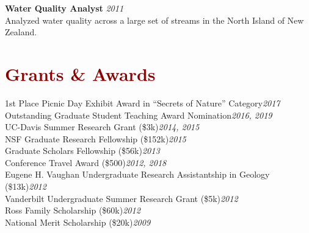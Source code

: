 \documentclass[11pt,margin,line]{resume}
\begin{document}
\begin{resume}
\textbf{Water Quality Analyst} \hfill \emph{2011}\\
Analyzed water quality across a large set of streams in the North Island of New Zealand.
\vspace{-1.5mm}


\vspace{-1mm}

\section{\large\textcolor{DarkRed}{Grants \& Awards}}

1st Place Picnic Day Exhibit Award in “Secrets of Nature” Category\hfill \emph{2017}\\
Outstanding Graduate Student Teaching Award Nomination\hfill \emph{2016, 2019}\\
UC-Davis Summer Research Grant (\$3k)\hfill \emph{2014, 2015}\\
NSF Graduate Research Fellowship (\$152k)\hfill \emph{2015}\\
Graduate Scholars Fellowship (\$56k)\hfill \emph{2013}\\
Conference Travel Award (\$500)\hfill \emph{2012, 2018}\\
Eugene H. Vaughan Undergraduate Research Assistantship in Geology (\$13k)\hfill \emph{2012}\\
Vanderbilt Undergraduate Summer Research Grant (\$5k)\hfill \emph{2012}\\
Ross Family Scholarship (\$60k)\hfill \emph{2012}\\
National Merit Scholarship (\$20k)\hfill \emph{2009}\\\\\\\\

\begin{comment}


\end{comment}
\end{resume}
\end{document}
